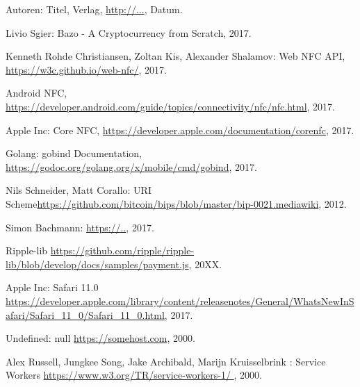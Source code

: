 \begin{thebibliography}{99}

 Autoren: Titel, Verlag, \url{http://...}, Datum.

 Livio Sgier: Bazo - A Cryptocurrency from Scratch, 2017.

 Kenneth Rohde Christiansen, Zoltan Kis, Alexander Shalamov: Web NFC API, \url{https://w3c.github.io/web-nfc/}, 2017.

 Android NFC, \url{https://developer.android.com/guide/topics/connectivity/nfc/nfc.html}, 2017.

 Apple Inc: Core NFC, \url{https://developer.apple.com/documentation/corenfc}, 2017.

 Golang: gobind Documentation, \url{https://godoc.org/golang.org/x/mobile/cmd/gobind}, 2017.

 Nils Schneider, Matt Corallo: URI Scheme\url{https://github.com/bitcoin/bips/blob/master/bip-0021.mediawiki}, 2012.

 Simon Bachmann:  \url{https://..}, 2017.

 Ripple-lib  \url{https://github.com/ripple/ripple-lib/blob/develop/docs/samples/payment.js}, 20XX.

 Apple Inc: Safari 11.0  \url{https://developer.apple.com/library/content/releasenotes/General/WhatsNewInSafari/Safari_11_0/Safari_11_0.html}, 2017.

 Undefined: null \url{https://somehost.com}, 2000.

 Alex Russell, Jungkee Song, Jake Archibald, Marijn Kruisselbrink : Service Workers \url{https://www.w3.org/TR/service-workers-1/
}, 2000.

\end{thebibliography}

